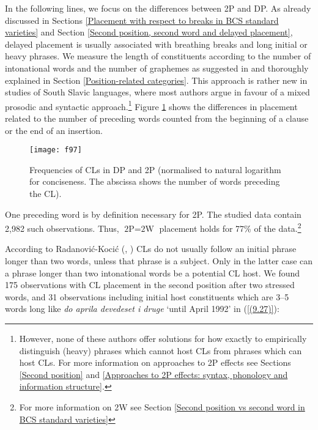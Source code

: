 In the following lines, we focus on the differences between 2P and DP. As already discussed in Sections \ref{Placement with respect to breaks in BCS standard varieties} and Section \ref{Second position, second word and delayed placement}, delayed placement is usually associated with breathing breaks and long initial or heavy phrases. We measure the length of constituents according to the number of intonational words and the number of graphemes as suggested in \citet{KCN18} and thoroughly explained in Section \ref{Position-related categories}. This approach is rather new in studies of South Slavic languages, where most authors argue in favour of a mixed prosodic and syntactic approach.\footnote{However, none of these authors offer solutions for how exactly to empirically distinguish (heavy) phrases which cannot host CLs from phrases which can host CLs. For more information on approaches to 2P effects see Sections \ref{Second position} and \ref{Approaches to 2P effects: syntax, phonology and information structure}.} Figure \ref{F.9.7} shows the differences in placement related to the number of preceding words counted from the beginning of a clause or the end of an insertion. 

\begin{figure}
\caption{Frequencies of CLs in DP and 2P (normalised to natural logarithm for conciseness. The abscissa shows the number of words preceding the CL).}
\label{F.9.7}
\texttt{[image: f97]}
\end{figure}

One preceding word is by definition necessary for 2P. The studied data contain 2,982 such observations. Thus,  $\text{2P}=\text{2W}$ placement holds for 77\% of the data.\footnote{For more information on 2W see Section \ref{Second position vs second word in BCS standard varieties}}

According to Radanović-Kocić (\citeyear[108ff]{RadanovicKocic88}, \citeyear[435]{RadanovicKocic96}) CLs do not usually follow an initial phrase longer than two words, unless that phrase is a subject. Only in the latter case can a phrase longer than two intonational words be a potential CL host. We found 175 observations with CL placement in the second position after two stressed words, and 31 observations including initial host constituents which are 3--5 words long like \textit{do aprila devedeset i druge} `until April 1992' in (\ref{(9.27)}): 


